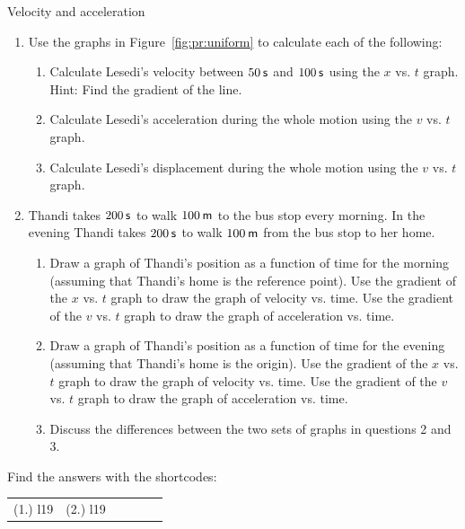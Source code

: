 \begin{exercises}{Velocity and acceleration }
            \nopagebreak
        \label{m38795*id71023}\begin{enumerate}[noitemsep, label=\textbf{\arabic*}. ] 
            \label{m38795*uid94}\item Use the graphs in Figure~\ref{fig:pr:uniform} to calculate each of the following:
\label{m38795*id71044}\begin{enumerate}[noitemsep, label=\textbf{\alph*}. ] 
            \label{m38795*uid95}\item Calculate Lesedi's velocity between $50\phantom{\rule{2pt}{0ex}}\mathsf{s}$ and $100\phantom{\rule{2pt}{0ex}}\mathsf{s}$ using the $x$ vs. $t$ graph. Hint: Find the gradient of the line.
\label{m38795*uid96}\item Calculate Lesedi's acceleration during the whole motion using the $v$ vs. $t$ graph.
\label{m38795*uid97}\item Calculate Lesedi's displacement during the whole motion using the $v$ vs. $t$ graph.
\end{enumerate}
                \label{m38795*uid98}\item Thandi takes $200\phantom{\rule{2pt}{0ex}}\mathsf{s}$ to walk $100\phantom{\rule{2pt}{0ex}}\mathsf{m}$ to the bus stop every morning. In the evening Thandi takes $200\phantom{\rule{2pt}{0ex}}\mathsf{s}$ to walk $100\phantom{\rule{2pt}{0ex}}\mathsf{m}$ from the bus stop to her home.\label{m38795*id7103444}\begin{enumerate}[noitemsep, label=\textbf{\alph*}. ] 
            \label{m38795*uid9523}\item  Draw a graph of Thandi's position as a function of time for the morning (assuming that Thandi's home is the reference point). Use the gradient of the $x$ vs. $t$ graph to draw the graph of velocity vs. time. Use the gradient of the $v$ vs. $t$ graph to draw the graph of acceleration vs. time.
\label{m38795*uid99}\item  Draw a graph of Thandi's position as a function of time for the evening (assuming that Thandi's home is the origin). Use the gradient of the $x$ vs. $t$ graph to draw the graph of velocity vs. time. Use the gradient of the $v$ vs. $t$ graph to draw the graph of acceleration vs. time.
\label{m38795*uid100}\item Discuss the differences between the two sets of graphs in questions 2 and 3.\end{enumerate}
        \end{enumerate}
\label{m38795*secfhsst!!!underscore!!!id2603}
\par {} Find the answers with the shortcodes:
 \par \begin{tabular}[h]{cccccc}
 (1.) l19  &  (2.) l19  & \end{tabular}
\end{exercises}

